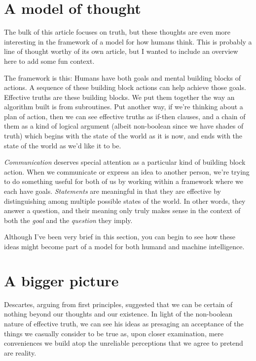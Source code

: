 \documentclass[20pt,]{extarticle}
\begin{document}
\section{A model of thought}\label{a-model-of-thought}

The bulk of this article focuses on truth, but these thoughts are even
more interesting in the framework of a model for how humans think. This
is probably a line of thought worthy of its own article, but I wanted to
include an overview here to add some fun context.

The framework is this: Humans have both goals and mental building blocks
of actions. A sequence of these building block actions can help achieve
those goals. Effective truths are these building blocks. We put them
together the way an algorithm built is from subroutines. Put another
way, if we're thinking about a plan of action, then we can see effective
truths as if-then clauses, and a chain of them as a kind of logical
argument (albeit non-boolean since we have shades of truth) which begins
with the state of the world as it is now, and ends with the state of the
world as we'd like it to be.

\emph{Communication} deserves special attention as a particular kind of
building block action. When we communicate or express an idea to another
person, we're trying to do something useful for both of us by working
within a framework where we each have goals. \emph{Statements} are
meaningful in that they are effective by distinguishing among multiple
possible states of the world. In other words, they answer a question,
and their meaning only truly makes sense in the context of both the
\emph{goal} and the \emph{question} they imply.

Although I've been very brief in this section, you can begin to see how
these ideas might become part of a model for both humand and machine
intelligence.

\section{A bigger picture}\label{a-bigger-picture}

Descartes, arguing from first principles, suggested that we can be
certain of nothing beyond our thoughts and our existence. In light of
the non-boolean nature of effective truth, we can see his ideas as
presaging an acceptance of the things we casually consider to be true
as, upon closer examination, mere conveniences we build atop the
unreliable perceptions that we agree to pretend are reality.
\end{document}
